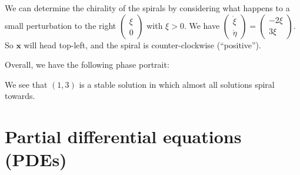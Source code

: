 \documentclass[a4paper]{article}
\begin{document}
\begin{eg}
      We can determine the chirality of the spirals by considering what happens to a small perturbation to the right $
      \begin{pmatrix}
        \xi\\0
      \end{pmatrix}$ with $\xi > 0$. We have $
      \begin{pmatrix}
        \dot\xi\\\dot\eta
      \end{pmatrix} = 
      \begin{pmatrix}
        -2\xi\\3\xi
      \end{pmatrix}$. So $\mathbf{x}$ will head top-left, and the spiral is counter-clockwise (``positive'').



    


      Overall, we have the following phase portrait:

      We see that $(1, 3)$ is a stable solution in which almost all solutions spiral towards. 
    \end{eg}

    \section{Partial differential equations (PDEs)}
\end{document}
